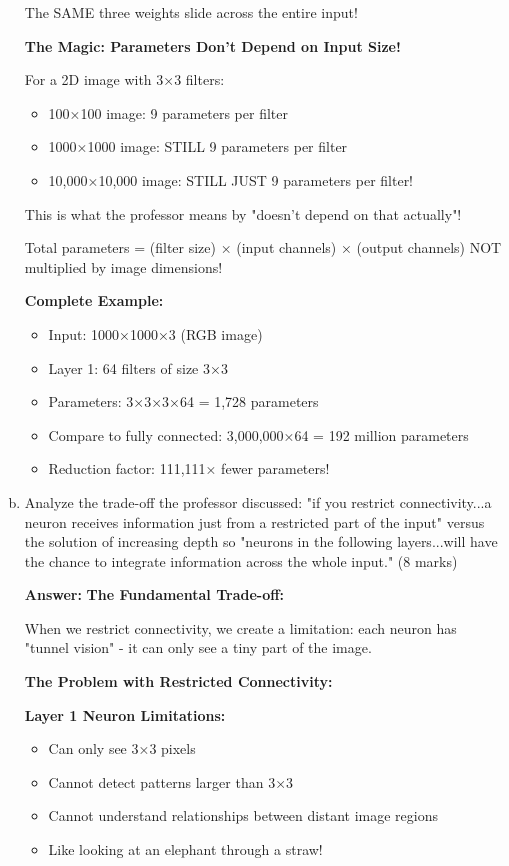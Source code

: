 \documentclass[12pt]{article}
\newcommand{\answer}[1]{{\color{answercolor}\textbf{Answer:} #1}}
\newcommand{\explanation}[1]{{\color{explanationcolor}#1}}
\begin{document}
\begin{enumerate}[(a)]
{{    The SAME three weights slide across the entire input!
    }
    
    \textbf{The Magic: Parameters Don't Depend on Input Size!}
    
    \explanation{
    For a 2D image with 3×3 filters:
    \begin{itemize}
        \item 100×100 image: 9 parameters per filter
        \item 1000×1000 image: STILL 9 parameters per filter
        \item 10,000×10,000 image: STILL JUST 9 parameters per filter!
    \end{itemize}
    
    This is what the professor means by "doesn't depend on that actually"!
    
    Total parameters = (filter size) × (input channels) × (output channels)
    NOT multiplied by image dimensions!
    }
    
    \textbf{Complete Example:}
    \explanation{
    \begin{itemize}
        \item Input: 1000×1000×3 (RGB image)
        \item Layer 1: 64 filters of size 3×3
        \item Parameters: 3×3×3×64 = 1,728 parameters
        \item Compare to fully connected: 3,000,000×64 = 192 million parameters
        \item Reduction factor: 111,111× fewer parameters!
    \end{itemize}
    }
    }
    
    \item Analyze the trade-off the professor discussed: "if you restrict connectivity...a neuron receives information just from a restricted part of the input" versus the solution of increasing depth so "neurons in the following layers...will have the chance to integrate information across the whole input." \hfill (8 marks)
    
    \answer{
    \textbf{The Fundamental Trade-off:}
    
    \explanation{
    When we restrict connectivity, we create a limitation: each neuron has "tunnel vision" - it can only see a tiny part of the image.
    }
    
    \textbf{The Problem with Restricted Connectivity:}
    
    \explanation{
    \textbf{Layer 1 Neuron Limitations:}
    \begin{itemize}
        \item Can only see 3×3 pixels
        \item Cannot detect patterns larger than 3×3
        \item Cannot understand relationships between distant image regions
        \item Like looking at an elephant through a straw!
    \end{itemize}
    
}}
\end{enumerate}
\end{document}
